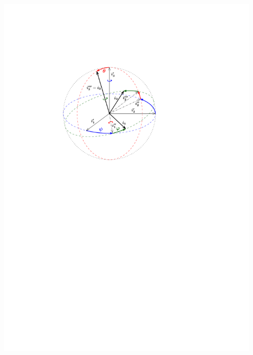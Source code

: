 \documentclass[draft,landscape,timbord]{notes}
\begin{document}
\begin{multicols*}{4}
\begin{enumerate}
    \includegraphics[width=1.0\linewidth]{euler_ang.pdf}


\end{enumerate}
\end{multicols*}
\end{document}
